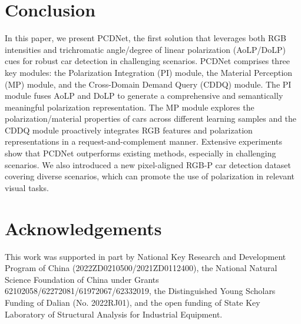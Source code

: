 \section{Conclusion}
\label{sec:conclusion}
In this paper, we present PCDNet, the first solution that leverages both RGB intensities and trichromatic angle/degree of linear polarization (AoLP/DoLP) cues for robust car detection in challenging scenarios. PCDNet comprises three key modules: the Polarization Integration (PI) module, the Material Perception (MP) module, and the Cross-Domain Demand Query (CDDQ) module. The PI module fuses AoLP and DoLP to generate a comprehensive and semantically meaningful polarization representation. The MP module explores the polarization/material properties of cars across different learning samples and the CDDQ module proactively integrates RGB features and polarization representations in a request-and-complement manner. Extensive experiments show that PCDNet outperforms existing methods, especially in challenging scenarios. We also introduced a new pixel-aligned RGB-P car detection dataset covering diverse scenarios, which can promote the use of polarization in relevant visual tasks.

\section{Acknowledgements}
This work was supported in part by National Key Research and Development Program of China (2022ZD0210500/2021ZD0112400), the National Natural Science Foundation of China under Grants 62102058/62272081/61972067/62332019, the Distinguished Young Scholars Funding of Dalian (No. 2022RJ01), and the open funding of State Key Laboratory of Structural Analysis for Industrial Equipment.